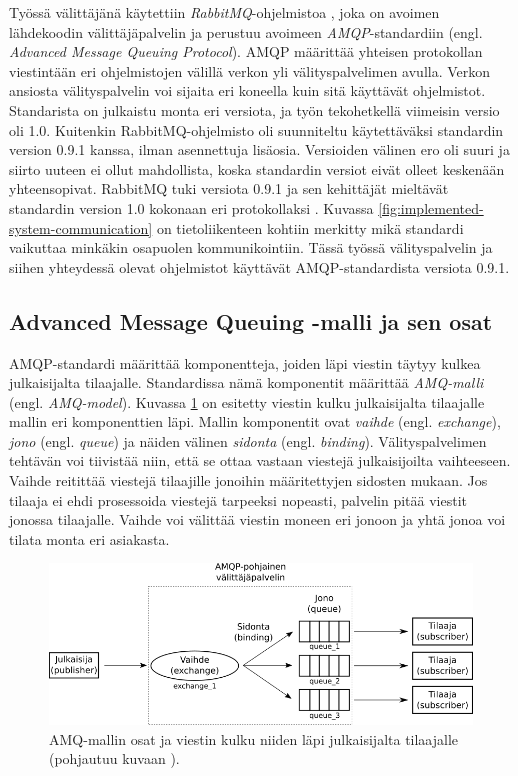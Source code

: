 Työssä välittäjänä käytettiin \emph{RabbitMQ}-ohjelmistoa \cite{rabbitmq-homepage}, joka on avoimen lähdekoodin välittäjäpalvelin ja perustuu avoimeen \emph{AMQP}-standardiin \cite{amqp-homepage} (engl. \emph{Advanced Message Queuing Protocol}). AMQP määrittää yhteisen protokollan viestintään eri ohjelmistojen välillä verkon yli välityspalvelimen avulla. Verkon ansiosta välityspalvelin voi sijaita eri koneella kuin sitä käyttävät ohjelmistot. Standarista on julkaistu monta eri versiota, ja työn tekohetkellä viimeisin versio oli 1.0. Kuitenkin RabbitMQ-ohjelmisto oli suunniteltu käytettäväksi standardin version 0.9.1 kanssa, ilman asennettuja lisäosia. Versioiden välinen ero oli suuri ja siirto uuteen ei ollut mahdollista, koska standardin versiot eivät olleet keskenään yhteensopivat. RabbitMQ tuki versiota 0.9.1 ja sen kehittäjät mieltävät standardin version 1.0 kokonaan eri protokollaksi \mbox{\cite{RabbitMQ-Compatibility-and-Conformance}}. Kuvassa \ref{fig:implemented-system-communication} on tietoliikenteen kohtiin merkitty mikä standardi vaikuttaa minkäkin osapuolen kommunikointiin. Tässä työssä välityspalvelin ja siihen yhteydessä olevat ohjelmistot käyttävät AMQP-standardista versiota 0.9.1.


\subsection{Advanced Message Queuing -malli ja sen osat}
AMQP-standardi määrittää komponentteja, joiden läpi viestin täytyy kulkea julkaisijalta tilaajalle. Standardissa nämä komponentit määrittää \emph{AMQ-malli} (engl. \emph{AMQ-model}). Kuvassa \ref{fig:amq-model-parts} on esitetty viestin kulku julkaisijalta tilaajalle mallin eri komponenttien läpi. Mallin komponentit ovat \emph{vaihde} (engl. \emph{exchange}), \emph{jono} (engl. \emph{queue}) ja näiden välinen \emph{sidonta} (engl. \emph{binding}). Välityspalvelimen tehtävän voi tiivistää niin, että se ottaa vastaan viestejä julkaisijoilta vaihteeseen. Vaihde reitittää viestejä tilaajille jonoihin määritettyjen sidosten mukaan. Jos tilaaja ei ehdi prosessoida viestejä tarpeeksi nopeasti, palvelin pitää viestit jonossa tilaajalle. Vaihde voi välittää viestin moneen eri jonoon ja yhtä jonoa voi tilata monta eri asiakasta.

\begin{figure}[ht!]
	\includegraphics[width=1\textwidth]{pictures/amq-model-parts.png}
	\caption{AMQ-mallin osat ja viestin kulku niiden läpi julkaisijalta tilaajalle (pohjautuu kuvaan \mbox{\cite[s.~11]{AMQP-specification}}).}
	\label{fig:amq-model-parts}
\end{figure}

